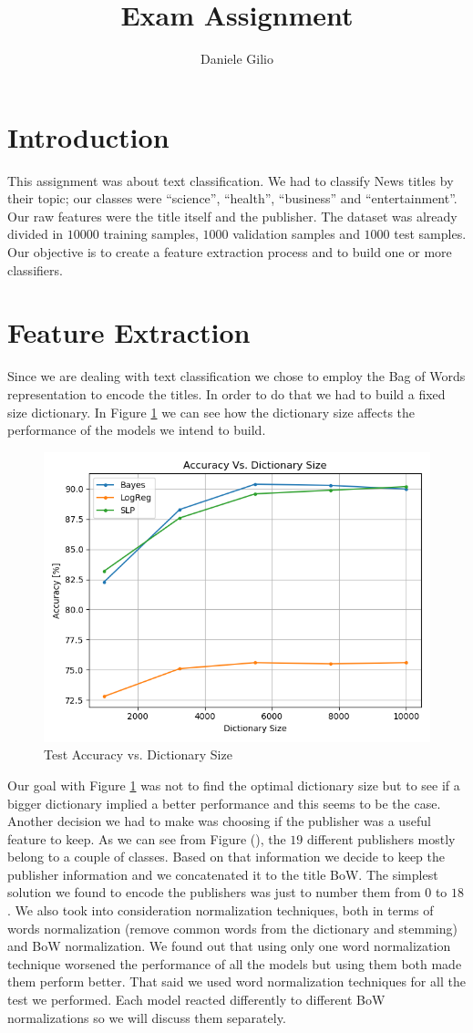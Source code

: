 \documentclass[10pt,a4paper]{report}
\author{Daniele Gilio}
\title{Exam Assignment}
\begin{document}
\section{Introduction}
This assignment was about text classification. We had to classify News titles by their topic; our classes were \enquote{science}, \enquote{health}, \enquote{business} and \enquote{entertainment}. Our raw features were the title itself and the publisher. The dataset was already divided in $10000$ training samples, $1000$ validation samples and $1000$ test samples. Our objective is to create a feature extraction process and to build one or more classifiers.
\section{Feature Extraction}
Since we are dealing with text classification we chose to employ the Bag of Words representation to encode the titles. In order to do that we had to build a fixed size dictionary. In Figure \ref{fig:acc_vs_dic} we can see how the dictionary size affects the performance of the models we intend to build.
\begin{figure}[!ht]
\centering
\includegraphics[width=0.5\linewidth]{acc_vs_dic.png}
\caption{Test Accuracy vs. Dictionary Size}
\label{fig:acc_vs_dic}
\end{figure}
Our goal with Figure \ref{fig:acc_vs_dic} was not to find the optimal dictionary size but to see if a bigger dictionary implied a better performance and this seems to be the case. Another decision we had to make was choosing if the publisher was a useful feature to keep. As we can see from Figure (), the $19$ different publishers mostly belong to a couple of classes. Based on that information we decide to keep the publisher information and we concatenated it to the title BoW. The simplest solution we found to encode the publishers was just to number them from $0$ to $18$. We also took into consideration normalization techniques, both in terms of words normalization (remove common words from the dictionary and stemming) and BoW normalization. We found out that using only one word normalization technique worsened the performance of all the models but using them both made them perform better. That said we used word normalization techniques for all the test we performed. Each model reacted differently to different BoW normalizations so we will discuss them separately.  
\end{document}
